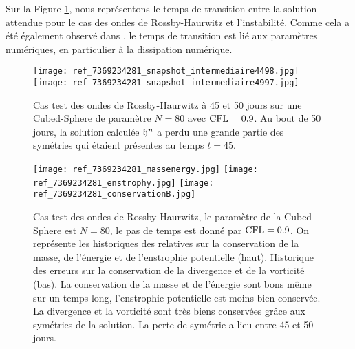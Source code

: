 Sur la Figure \ref{fig: rossby 4550}, nous représentons le temps de transition entre la solution attendue pour le cas des ondes de Rossby-Haurwitz et l'instabilité. Comme cela a été également observé dans \cite{Ullrich2011, Ullrich2010}, le temps de transition est lié aux paramètres numériques, en particulier à la dissipation numérique.

\begin{figure}[htbp]
\begin{center}
\texttt{[image: ref\_7369234281\_snapshot\_intermediaire4498.jpg]}
\texttt{[image: ref\_7369234281\_snapshot\_intermediaire4997.jpg]}
\end{center}
\caption{Cas test des ondes de Rossby-Haurwitz à 45 et 50 jours sur une Cubed-Sphere de paramètre $N=80$ avec $\text{CFL}=0.9$. Au bout de 50 jours, la solution calculée $\mathfrak{h}^n$ a perdu une grande partie des symétries qui étaient présentes au temps $t=45$.}
\label{fig: rossby 4550}
\end{figure}

\begin{figure}[htbp]
\begin{center}
\texttt{[image: ref\_7369234281\_massenergy.jpg]}
\texttt{[image: ref\_7369234281\_enstrophy.jpg]}
\texttt{[image: ref\_7369234281\_conservationB.jpg]}
\end{center}
\caption{Cas test des ondes de Rossby-Haurwitz, le paramètre de la Cubed-Sphere est $N=80$, le pas de temps est donné par $\text{CFL}=0.9$. On représente les historiques des relatives sur la conservation de la masse, de l'énergie et de l'enstrophie potentielle (haut). Historique des erreurs sur la conservation de la divergence et de la vorticité (bas). La conservation de la masse et de l'énergie sont bons même sur un temps long, l'enstrophie potentielle est moins bien conservée. La divergence et la vorticité sont très biens conservées grâce aux symétries de la solution. La perte de symétrie a lieu entre 45 et 50 jours.}
\label{fig: rossby conservation2}
\end{figure}